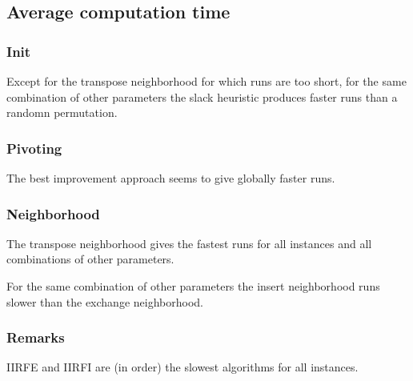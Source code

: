 \subsection{Average computation time}


\subsubsection{Init}

Except for the transpose neighborhood for which runs are too short, for the same combination of other parameters the slack heuristic produces faster runs than a randomn permutation.

\subsubsection{Pivoting}

The best improvement approach seems to give globally faster runs.

\subsubsection{Neighborhood}

The transpose neighborhood gives the fastest runs for all instances and all combinations of other parameters.

For the same combination of other parameters the insert neighborhood runs slower than the exchange neighborhood.


\subsubsection{Remarks}

IIRFE and IIRFI are (in order) the slowest algorithms for all instances.
